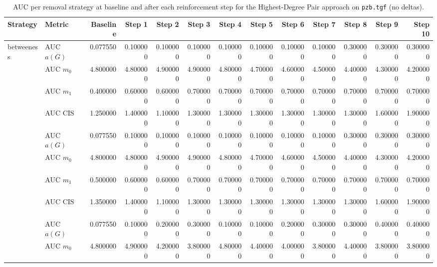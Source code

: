 \begin{table}[htbp]
  \centering
  \caption{AUC per removal strategy at baseline and after each reinforcement step for the Highest-Degree Pair approach on \texttt{pzb.tgf} (no deltas).}
  \label{tab:pzb-highest_degree_pair-auc}
\setlength{\tabcolsep}{2.5pt}
  \begin{tabular}{llrrrrrrrrrrr}
    \toprule
    \textbf{Strategy} & \textbf{Metric} & \textbf{Baseline} & \textbf{Step 1} & \textbf{Step 2} & \textbf{Step 3} & \textbf{Step 4} & \textbf{Step 5} & \textbf{Step 6} & \textbf{Step 7} & \textbf{Step 8} & \textbf{Step 9} & \textbf{Step 10} \\
    \midrule
    \multirow{4}{*}{betweeness} & AUC $a(G)$ & 0.077550 & 0.100000 & 0.100000 & 0.100000 & 0.100000 & 0.100000 & 0.100000 & 0.100000 & 0.300000 & 0.300000 & 0.300000 \\
    & AUC $m_0$ & 4.800000 & 4.800000 & 4.900000 & 4.900000 & 4.800000 & 4.700000 & 4.600000 & 4.500000 & 4.400000 & 4.300000 & 4.200000 \\
    & AUC $m_1$ & 0.400000 & 0.600000 & 0.600000 & 0.700000 & 0.700000 & 0.700000 & 0.700000 & 0.700000 & 0.700000 & 0.700000 & 0.700000 \\
    & AUC CIS & 1.250000 & 1.400000 & 1.100000 & 1.300000 & 1.300000 & 1.300000 & 1.300000 & 1.300000 & 1.300000 & 1.600000 & 1.900000 \\
    \addlinespace
    \multirow{4}{*}{closeness} & AUC $a(G)$ & 0.077550 & 0.100000 & 0.100000 & 0.100000 & 0.100000 & 0.100000 & 0.100000 & 0.100000 & 0.300000 & 0.300000 & 0.300000 \\
    & AUC $m_0$ & 4.800000 & 4.800000 & 4.900000 & 4.900000 & 4.800000 & 4.700000 & 4.600000 & 4.500000 & 4.400000 & 4.300000 & 4.200000 \\
    & AUC $m_1$ & 0.500000 & 0.600000 & 0.600000 & 0.700000 & 0.700000 & 0.700000 & 0.700000 & 0.700000 & 0.700000 & 0.700000 & 0.700000 \\
    & AUC CIS & 1.350000 & 1.400000 & 1.100000 & 1.300000 & 1.300000 & 1.300000 & 1.300000 & 1.300000 & 1.300000 & 1.600000 & 1.900000 \\
    \addlinespace
    \multirow{4}{*}{core influence} & AUC $a(G)$ & 0.077550 & 0.100000 & 0.200000 & 0.300000 & 0.100000 & 0.100000 & 0.200000 & 0.300000 & 0.300000 & 0.400000 & 0.400000 \\
    & AUC $m_0$ & 4.800000 & 4.900000 & 4.200000 & 3.800000 & 4.800000 & 4.400000 & 4.000000 & 3.800000 & 4.400000 & 3.800000 & 3.800000 \\

\end{tabular}
\end{table}
